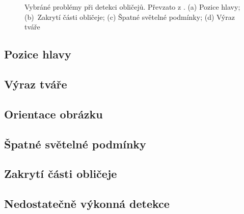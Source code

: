 \begin{figure}[H]
  \begin{center}
  \label{fdproblems}
  \caption{Vybráné problémy při detekci obličejů. Převzato z \cite{frReview}. (a) Pozice hlavy; (b)~Zakrytí části obličeje; (c) Špatné světelné podmínky; (d) Výraz tváře}
  \end{center}
\end{figure}

\subsection*{Pozice hlavy}

\subsection*{Výraz tváře}

\subsection*{Orientace obrázku}

\subsection*{Špatné světelné podmínky}

\subsection*{Zakrytí části obličeje}

\subsection*{Nedostatečně výkonná detekce}


